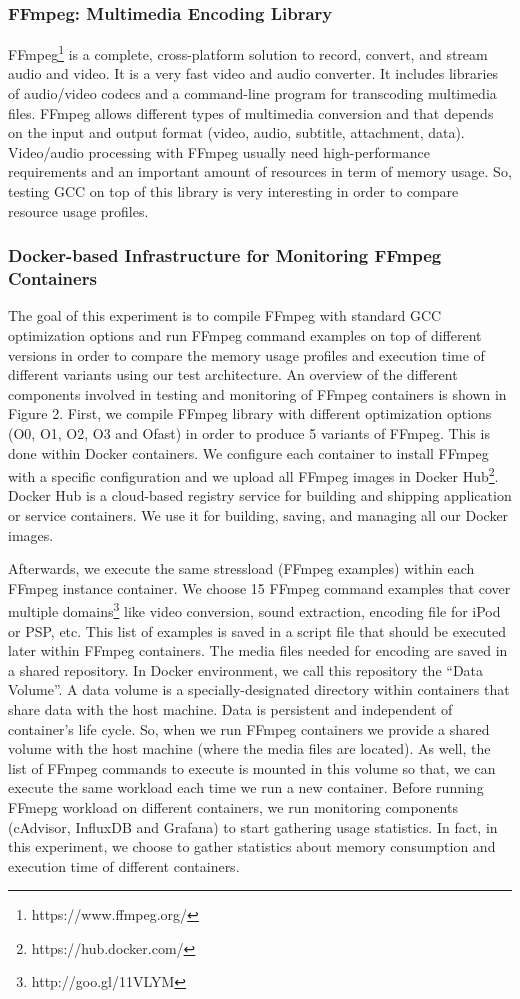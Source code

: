 \subsubsection{FFmpeg: Multimedia Encoding Library}
FFmpeg\footnote{https://www.ffmpeg.org/} is a complete, cross-platform solution to record, convert, and stream audio and video. It is a very fast video and audio converter. It includes libraries of audio/video codecs and a command-line program for transcoding multimedia files. FFmpeg allows different types of multimedia conversion and that depends on the input and output format (video, audio, subtitle, attachment, data). Video/audio processing with FFmpeg usually need high-performance requirements and an important amount of resources in term of memory usage. So, testing GCC on top of this library is very interesting in order to compare resource usage profiles. 
\subsubsection{Docker-based Infrastructure for Monitoring FFmpeg Containers}


The goal of this experiment is to compile FFmpeg with standard GCC optimization options and run FFmpeg command examples on top of different versions in order to compare the memory usage profiles and execution time of different variants using our test architecture. An overview of the different components involved in testing and monitoring of FFmpeg containers is shown in Figure 2. 
First, we compile FFmpeg library with different optimization options  (O0, O1, O2, O3 and Ofast) in order to produce 5 variants of FFmpeg. This is done within Docker containers. We configure each container to install FFmpeg with a specific configuration and we upload all FFmpeg images in Docker Hub\footnote{https://hub.docker.com/}.
Docker Hub is a cloud-based registry service for building and shipping application or service containers. We use it for building, saving, and managing all our Docker images.

Afterwards, we execute the same stressload (FFmpeg examples) within each FFmpeg instance container. We choose 15 FFmpeg command examples that cover multiple domains\footnote{http://goo.gl/11VLYM} like video conversion, sound extraction, encoding file for iPod or PSP, etc. This list of examples is saved in a script file that should be executed later within FFmpeg containers. The media files needed for encoding are saved in a shared repository. In Docker environment, we call this repository the “Data Volume”. A data volume is a specially-designated directory within containers that share data with the host machine. Data is persistent and independent of container's life cycle. So, when we run FFmpeg containers we provide a shared volume with the host machine (where the media files are located). As well, the list of FFmpeg commands to execute is mounted in this volume so that, we can execute the same workload each time we run a new container.
Before running FFmepg workload on different containers, we run monitoring components (cAdvisor, InfluxDB and Grafana) to start gathering usage statistics.
In fact, in this experiment, we choose to gather statistics about memory consumption and execution time of different containers. 

